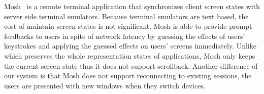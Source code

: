 Mosh~\cite{winstein2012mosh} is a remote terminal application 
that synchronizes client screen states with server side terminal emulators. 
Because terminal emulators are text based, the cost of maintain screen states
is not significant.
Mosh is able to provide prompt feedbacks to users in spite of network latency
by guessing the effects of users' keystrokes and applying the guessed effects on
users' screens immediately.
Unlike \cb which preserves the whole representation states of applications,
Mosh only keeps the current screen state thus it does not support scrollback.
Another difference of our system is that
Mosh does not support reconnecting to existing sessions, the users are presented
with new windows when they switch devices.

